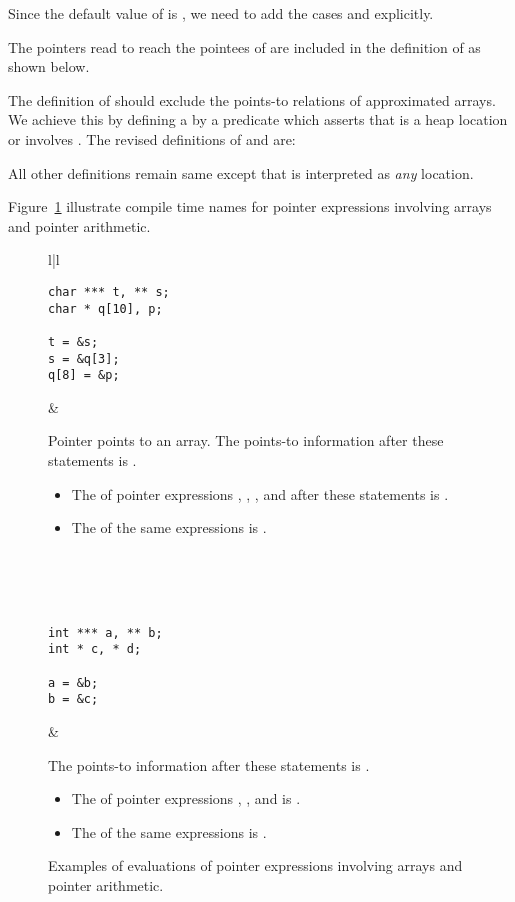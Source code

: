 \documentclass[a4paper,11pt,fleqn]{article}
\newcommand{\must}{\text{\sf\em Must\/}\xspace}
\newcommand{\Kill}{\text{{\sf\em Kill}}\xspace}
\begin{document}
Since the default value of \derefp is , we need to add the cases 
\text{} and \text{} explicitly.

The pointers read to reach the pointees of \text{} are included in the definition of
\rval as shown below.



The definition of \Kill should exclude the points-to relations of
approximated arrays. We achieve this by defining a by a predicate
 which asserts that  is a heap location or involves
. The revised definitions of \Kill and \must are:


All other definitions remain same except that
\text{} is interpreted as {\em any\/} location. 


Figure~\ref{fig:exmp.pointer.arith} illustrate compile time names for pointer expressions involving arrays and pointer arithmetic.

\begin{figure}[t]
\begin{center}
\begin{tabular}{l|l}
\begin{minipage}{40mm}
\begin{verbatim}
char *** t, ** s; 
char * q[10], p;

t = &s;
s = &q[3];
q[8] = &p;

\end{verbatim}
\end{minipage}
&
\begin{minipage}{110mm}
\raggedright
Pointer  points to an array. The points-to information after these statements is
\text{}. 
\begin{itemize}
\item The
\lval of pointer expressions 
\text{},
\text{},
\text{}, and
\text{} after these statements is
. 
\item The \rval of the same expressions is .
\end{itemize}
\end{minipage}
\\
\\ \hline
\\
\begin{minipage}{40mm}
\begin{verbatim}
int *** a, ** b;
int * c, * d;

a = &b;
b = &c;
\end{verbatim}
\end{minipage}
&
\begin{minipage}{103mm}
\raggedright
The points-to information after these statements is
\text{}.
\begin{itemize}
\item The \lval of pointer expressions 
	\text{},
	\text{}, and
	\text{} is 
	. 
\item The \rval of the same expressions is  \target.
\end{itemize}
\end{minipage}
\end{tabular}
\end{center}
\caption{Examples of evaluations of pointer expressions involving arrays and pointer arithmetic.}
\label{fig:exmp.pointer.arith}
\end{figure}
\end{document}
